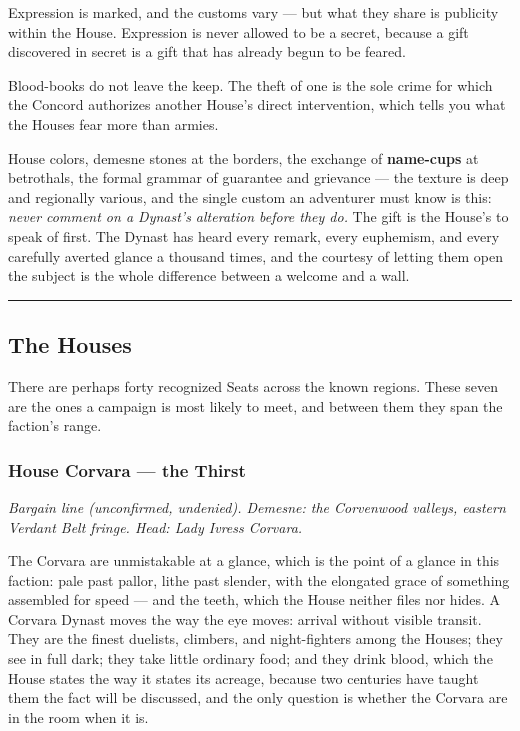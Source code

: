 Expression is marked, and the customs vary --- but what they share is publicity within the House. Expression is never allowed to be a secret, because a gift discovered in secret is a gift that has already begun to be feared.

Blood-books do not leave the keep. The theft of one is the sole crime for which the Concord authorizes another House's direct intervention, which tells you what the Houses fear more than armies.

House colors, demesne stones at the borders, the exchange of \textbf{name-cups} at betrothals, the formal grammar of guarantee and grievance --- the texture is deep and regionally various, and the single custom an adventurer must know is this: \textit{never comment on a Dynast's alteration before they do.} The gift is the House's to speak of first. The Dynast has heard every remark, every euphemism, and every carefully averted glance a thousand times, and the courtesy of letting them open the subject is the whole difference between a welcome and a wall.

\medskip\hrule\medskip

\subsection{The Houses}

There are perhaps forty recognized Seats across the known regions. These seven are the ones a campaign is most likely to meet, and between them they span the faction's range.

\subsubsection{House Corvara --- the Thirst}

\textit{Bargain line (unconfirmed, undenied). Demesne: the Corvenwood valleys, eastern Verdant Belt fringe. Head: Lady Ivress Corvara.}

The Corvara are unmistakable at a glance, which is the point of a glance in this faction: pale past pallor, lithe past slender, with the elongated grace of something assembled for speed --- and the teeth, which the House neither files nor hides. A Corvara Dynast moves the way the eye moves: arrival without visible transit. They are the finest duelists, climbers, and night-fighters among the Houses; they see in full dark; they take little ordinary food; and they drink blood, which the House states the way it states its acreage, because two centuries have taught them the fact will be discussed, and the only question is whether the Corvara are in the room when it is.

